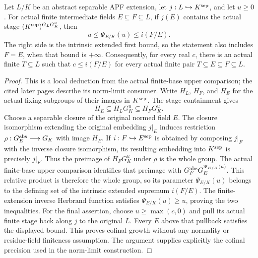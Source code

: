 \begin{lemma}
\label{fw:apf-deep-finite-tail}
\leanok
Let $L/K$ be an abstract separable APF extension, let
$j:L\hookrightarrow K^{\rm sep}$, and let $u\geq0$.
For actual finite intermediate fields $E\subseteq F\subseteq L$,
if $j(E)$ contains the actual stage
$(K^{\rm sep})^{G_LG_K^u}$, then
\[
 u\leq\Psi_{E/K}(u)\leq i(F/E).
\]
The right side is the intrinsic extended first bound, so the
statement also includes $F=E$, when that bound is $+\infty$.
Consequently, for every real $c$, there is an actual finite
$T\subseteq L$ such that $c\leq i(F/E)$ for every actual
finite pair $T\subseteq E\subseteq F\subseteq L$.
\end{lemma}
\begin{proof}
This is a local deduction from the actual finite-base upper comparison;
the cited later pages describe its norm-limit consumer.
Write $H_L$, $H_F$, and $H_E$ for the actual fixing subgroups
of their images in $K^{\rm sep}$. The stage containment gives
\[
 H_E\subseteq H_LG_K^u\subseteq H_FG_K^u.
\]
Choose a separable closure of the original normed field $E$.
The closure isomorphism extending the original embedding
$j|_E$ induces restriction
$\rho:G_E^{\rm abs}\longrightarrow G_K$ with image $H_E$.
If $i:F\hookrightarrow E^{\rm sep}$ is obtained by composing
$j|_F$ with the inverse closure isomorphism, its resulting
embedding into $K^{\rm sep}$ is precisely $j|_F$.
Thus the preimage of $H_FG_K^u$ under $\rho$ is the whole
group. The actual finite-base upper comparison identifies
that preimage with
$G_F^{\rm abs}G_E^{\Psi_{E/K}(u)}$.
This relative product is therefore the whole group, so its
parameter $\Psi_{E/K}(u)$ belongs to the defining set of the
intrinsic extended supremum $i(F/E)$.
The finite-extension inverse Herbrand function satisfies
$\Psi_{E/K}(u)\geq u$, proving the two inequalities.
For the final assertion, choose $u\geq\max(c,0)$ and pull its
actual finite stage back along $j$ to the original $L$.
Every $E$ above that pullback satisfies the displayed bound.
This proves cofinal growth without any normality or residue-field
finiteness assumption. The argument supplies explicitly the
cofinal precision used in the norm-limit construction.
\end{proof}

